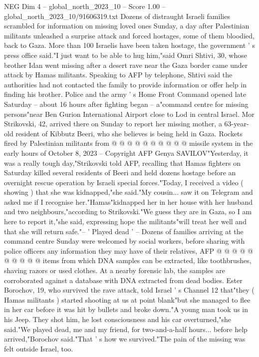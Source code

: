 \begin{textsample}{NEG Dim 4 – global\_north\_2023\_10 – Score 1.00 – global\_north\_2023\_10/91606319.txt}  \label{ex:f4_neg_008}
Dozens of distraught Israeli families scrambled for information on missing loved ones Sunday, a day after Palestinian militants unleashed a surprise attack and forced hostages, some of them bloodied, back to Gaza.
More than 100 Israelis have been taken hostage, the government ' s press office said."I just want to be able to hug him,"said Omri Shtivi, 30, whose brother Idan went missing after a desert rave near the Gaza border came under attack by Hamas militants.
Speaking to AFP by telephone, Shtivi said the authorities had not contacted the family to provide information or offer help in finding his brother.
Police and the army ' s Home Front Command opened late Saturday -- about 16 hours after fighting began -- a"command centre for missing persons"near Ben Gurion International Airport close to Lod in central Israel.
Mor Strikovski, 42, arrived there on Sunday to report her missing mother, a 63-year-old resident of Kibbutz Beeri, who she believes is being held in Gaza.
Rockets fired by Palestinian militants from @ @ @ @ @ @ @ @ @ @ missile system in the early hours of October 8, 2023 -- Copyright AFP Genya SAVILOV"Yesterday, it was a really tough day,"Strikovski told AFP, recalling that Hamas fighters on Saturday killed several residents of Beeri and held dozens hostage before an overnight rescue operation by Israeli special forces."Today, I received a video ( showing ) that she was kidnapped,"she said."My cousin... saw it on Telegram and asked me if I recognise her."Hamas"kidnapped her in her house with her husband and two neighbours,"according to Strikovski."We guess they are in Gaza, so I am here to report it,"she said, expressing hope the militants"will treat her well and that she will return safe."-- ' Played dead ' -- Dozens of families arriving at the command centre Sunday were welcomed by social workers, before sharing with police officers any information they may have of their relatives, AFP @ @ @ @ @ @ @ @ @ @ items from which DNA samples can be extracted, like toothbrushes, shaving razors or used clothes.
At a nearby forensic lab, the samples are corroborated against a database with DNA extracted from dead bodies.
Ester Borochov, 19, who survived the rave attack, told Israel ' s Channel 12 that"they ( Hamas militants ) started shooting at us at point blank"but she managed to flee in her car before it was hit by bullets and broke down."A young man took us in his Jeep.
They shot him, he lost consciousness and his car overturned,"she said."We played dead, me and my friend, for two-and-a-half hours... before help arrived,"Borochov said."That ' s how we survived."The pain of the missing was felt outside Israel, too.

\end{textsample}
